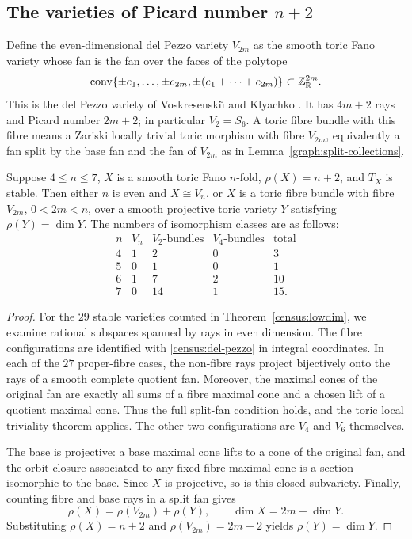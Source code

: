 \subsection{The varieties of Picard number \texorpdfstring{$n+2$}{n+2}}

Define the even-dimensional del Pezzo variety $V_{2m}$
as the smooth toric Fano variety whose fan is the fan over the faces
of the polytope
\begin{equation}\label{census:del-pezzo}
 \operatorname{conv}\{\pm e_1,\ldots,\pm e_{2m},
                  \pm(e_1+\cdots+e_{2m})\}\subset\mathbb{Z}^{2m}_{\mathbb{R}}.
\end{equation}
This is the del Pezzo variety of Voskresenski\u\i{} and Klyachko
\cite{VoskresenskiiKlyachko1985}.  It has $4m+2$ rays and Picard number
$2m+2$; in particular $V_2=S_6$.  A toric fibre bundle with this fibre
means a Zariski locally trivial toric morphism with fibre $V_{2m}$,
equivalently a fan split by the base fan and the fan of $V_{2m}$ as in
Lemma~\ref{graph:split-collections}.

\begin{theorem}\label{census:boundary}
Suppose $4\le n\le7$, $X$ is a smooth toric Fano $n$-fold,
$\rho(X)=n+2$, and $T_X$ is stable.  Then either $n$ is even and
$X\cong V_n$, or $X$ is a toric fibre bundle with fibre $V_{2m}$,
$0<2m<n$, over a smooth projective toric variety $Y$ satisfying
$\rho(Y)=\dim Y$.  The numbers of isomorphism classes are as follows:
\[
 \begin{array}{c|rrrr}
 n&V_n&V_2\text{-bundles}&V_4\text{-bundles}&\text{total}\\ \hline
 4&1&2&0&3\\
 5&0&1&0&1\\
 6&1&7&2&10\\
 7&0&14&1&15.
 \end{array}
\]
\end{theorem}

\begin{proof}
For the $29$ stable varieties counted in
Theorem~\ref{census:lowdim}, we examine rational subspaces spanned by
rays in even dimension.  The fibre configurations are identified with
\eqref{census:del-pezzo} in integral coordinates.  In each of the $27$
proper-fibre cases, the non-fibre rays project bijectively onto the
rays of a smooth complete quotient fan.  Moreover, the maximal cones
of the original fan are exactly all sums of a fibre maximal cone and
a chosen lift of a quotient maximal cone.  Thus the full split-fan
condition holds, and the toric local triviality theorem applies.
The other two configurations are $V_4$ and $V_6$ themselves.

The base is projective: a base maximal cone lifts to a cone of the
original fan, and the orbit closure associated to any fixed fibre
maximal cone is a section isomorphic to the base.  Since $X$ is
projective, so is this closed subvariety.  Finally, counting fibre
and base rays in a split fan gives
\[
 \rho(X)=\rho(V_{2m})+\rho(Y),\qquad
 \dim X=2m+\dim Y.
\]
Substituting $\rho(X)=n+2$ and $\rho(V_{2m})=2m+2$ yields
$\rho(Y)=\dim Y$.
\end{proof}

